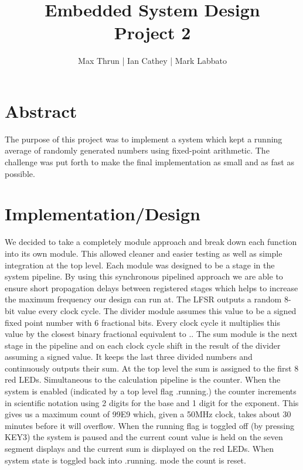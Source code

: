 \documentclass[12pt]{article}
\title{Embedded System Design \\ Project 2}
\author{ Max Thrun | Ian Cathey | Mark Labbato }
\begin{document}
\maketitle


\section*{Abstract}
The purpose of this project was to implement a system which kept a running average of randomly generated numbers using fixed-point arithmetic. The challenge was put forth to make the final implementation as small and as fast as possible.


\section*{Implementation/Design}
We decided to take a completely module approach and break down each function into its own module. This allowed cleaner and easier testing as well as simple integration at the top level. Each module was designed to be a stage in the system pipeline. By using this synchronous pipelined approach we are able to ensure short propagation delays between registered stages which helps to increase the maximum frequency our design can run at. The LFSR outputs a random 8-bit value every clock cycle. The divider module assumes this value to be a signed fixed point number with 6 fractional bits. Every clock cycle it multiplies this value by the closest binary fractional equivalent to .. The sum module is the next stage in the pipeline and on each clock cycle shift in the result of the divider assuming a signed value. It keeps the last three divided numbers and continuously outputs their sum. At the top level the sum is assigned to the first 8 red LEDs. Simultaneous to the calculation pipeline is the counter. When the system is enabled (indicated by a top level flag .running.) the counter increments in scientific notation using 2 digits for the base and 1 digit for the exponent. This gives us a maximum count of 99E9 which, given a 50MHz clock, takes about 30 minutes before it will overflow. When the running flag is toggled off (by pressing KEY3) the system is paused and the current count value is held on the seven segment displays and the current sum is displayed on the red LEDs. When system state is toggled back into .running. mode the count is reset.
\end{document}
